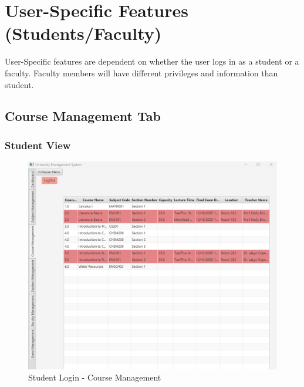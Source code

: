 \newpage
\section{User-Specific Features (Students/Faculty)}

User-Specific features are dependent on whether the user logs in as a student or a faculty. Faculty members will have different privileges and information than student.





\subsection{Course Management Tab}

\lipsum[9]

\newpage
\subsubsection{Student View}

\lipsum[9]

\begin{figure}[ht]
    \centering
        \centering\includegraphics[width=0.7\linewidth]{figures/STD_Course_Management_Tab.png}
        \caption{Student Login - Course Management}
        \FloatBarrier
\end{figure}


